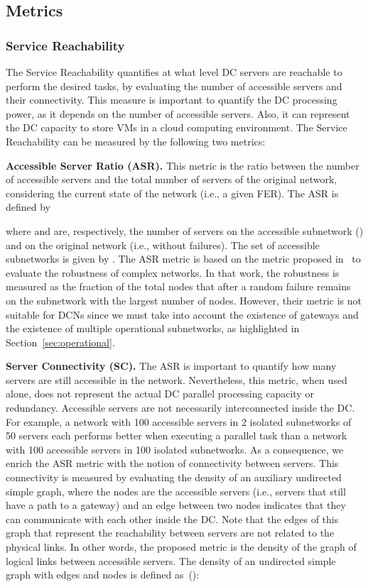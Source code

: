 \subsection{Metrics}
\label{sec:survivalTime} 
\subsubsection{Service Reachability}
The Service Reachability quantifies at what level DC servers are reachable to perform the desired tasks, by evaluating the number of accessible servers and their connectivity.
This measure is important to quantify the DC processing power, as it depends on the number of accessible servers.
Also, it can represent the DC capacity to store VMs in a cloud computing environment.
The Service Reachability can be measured by the following two metrics:

\textbf{Accessible Server Ratio (ASR).} This metric is the ratio between the number of accessible servers and the total number of servers of the original network, considering the current state of the network (i.e., a given FER). The ASR is defined by

where  and  are, respectively, the number of servers on the  accessible subnetwork () and on the original network (i.e., without failures). The set of accessible subnetworks is given by . The ASR metric is based on the metric proposed in~\cite{albert2000error} to evaluate the robustness of complex networks. In that work, the robustness is measured as the fraction of the total nodes that after a random failure remains on the subnetwork with the largest number of nodes. However, their metric is not suitable for DCNs since we must take into account the existence of gateways and the existence of multiple operational subnetworks, as highlighted in Section~\ref{sec:operational}. 

\textbf{Server Connectivity (SC).} The ASR is important to quantify how many servers are still accessible in the network. Nevertheless, this metric, when used alone, does not represent the actual DC parallel processing capacity or redundancy. Accessible servers are not necessarily interconnected inside the DC. For example, a network with 100 accessible servers in 2 isolated subnetworks of 50 servers each performs better when executing a parallel task than a network with 100 accessible servers in 100 isolated subnetworks. As a consequence, we enrich the ASR metric with the notion of connectivity between servers. This connectivity is measured by evaluating the density of an auxiliary undirected simple graph, where the nodes are the accessible servers (i.e., servers that still have a path to a gateway) and an edge between two nodes indicates that they can communicate with each other inside the DC. Note that the edges of this graph that represent the reachability between servers are not related to the 
physical links. In other words, the 
proposed metric is the density of the graph of logical links between accessible servers. The density of an undirected simple graph with  edges and  nodes is defined as~(\cite{coleman1983estimation}):

